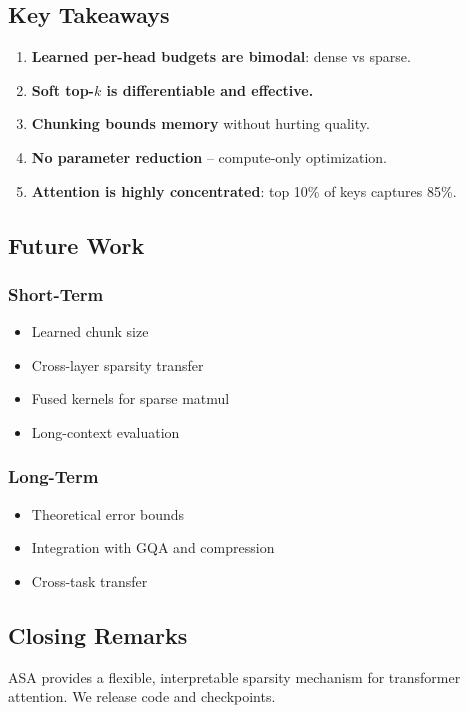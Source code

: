 \subsection{Key Takeaways}

\begin{enumerate}
\item \textbf{Learned per-head budgets are bimodal}: dense vs sparse.
\item \textbf{Soft top-$k$ is differentiable and effective.}
\item \textbf{Chunking bounds memory} without hurting quality.
\item \textbf{No parameter reduction} -- compute-only optimization.
\item \textbf{Attention is highly concentrated}: top 10\% of keys captures 85\%.

\end{enumerate}
\subsection{Future Work}

\subsubsection{Short-Term}
\begin{itemize}
\item Learned chunk size
\item Cross-layer sparsity transfer
\item Fused kernels for sparse matmul
\item Long-context evaluation

\end{itemize}
\subsubsection{Long-Term}
\begin{itemize}
\item Theoretical error bounds
\item Integration with GQA and compression
\item Cross-task transfer

\end{itemize}
\subsection{Closing Remarks}

ASA provides a flexible, interpretable sparsity mechanism for transformer 
attention. We release code and checkpoints.

